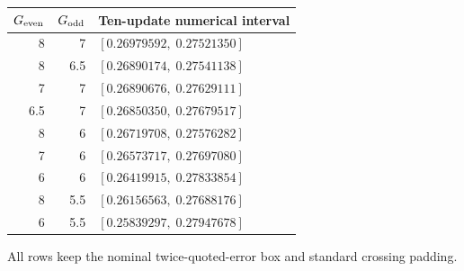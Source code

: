 \begin{center}
\begin{tabular}{@{}rrl@{}}\toprule
$G_{\rm even}$ & $G_{\rm odd}$ & Ten-update numerical interval\\\midrule
8 & 7 & $[0.26979592,\;0.27521350]$ \\
8 & 6.5 & $[0.26890174,\;0.27541138]$ \\
7 & 7 & $[0.26890676,\;0.27629111]$ \\
6.5 & 7 & $[0.26850350,\;0.27679517]$ \\
8 & 6 & $[0.26719708,\;0.27576282]$ \\
7 & 6 & $[0.26573717,\;0.27697080]$ \\
6 & 6 & $[0.26419915,\;0.27833854]$ \\
8 & 5.5 & $[0.26156563,\;0.27688176]$ \\
6 & 5.5 & $[0.25839297,\;0.27947678]$ \\
\bottomrule
\end{tabular}
\end{center}
All rows keep the nominal twice-quoted-error box and standard crossing padding.
